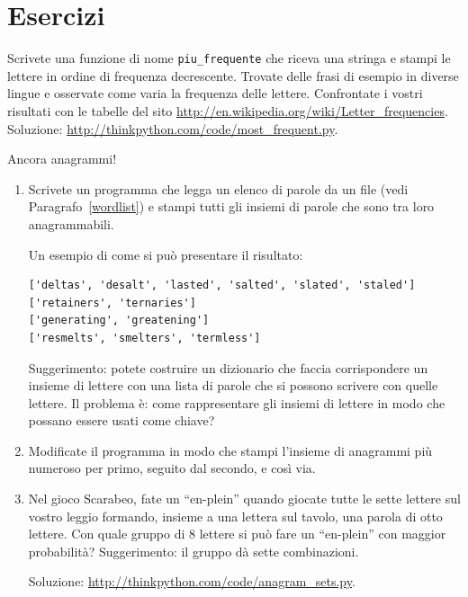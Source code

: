 \documentclass[10pt]{book}
\begin{document}
\section{Esercizi}

\begin{exercise}

Scrivete una funzione di nome \verb"piu_frequente" che riceva una stringa e stampi le lettere in ordine di frequenza decrescente. Trovate delle frasi di esempio in diverse lingue e osservate come varia la frequenza delle lettere. Confrontate i vostri risultati con le tabelle del sito
\url{http://en.wikipedia.org/wiki/Letter_frequencies}.  Soluzione:
\url{http://thinkpython.com/code/most_frequent.py}.  

\end{exercise}


\begin{exercise}
\label{anagrams}

Ancora anagrammi!

\begin{enumerate}

\item Scrivete un programma che legga un elenco di parole da un file (vedi Paragrafo~\ref{wordlist}) e stampi tutti gli insiemi di parole che sono tra loro anagrammabili.

Un esempio di come si può presentare il risultato:

\begin{verbatim}
['deltas', 'desalt', 'lasted', 'salted', 'slated', 'staled']
['retainers', 'ternaries']
['generating', 'greatening']
['resmelts', 'smelters', 'termless']
\end{verbatim}
%
Suggerimento: potete costruire un dizionario che faccia corrispondere un insieme di lettere con una lista di parole che si possono scrivere con quelle lettere. Il problema è: come rappresentare gli insiemi di lettere in modo che possano essere usati come chiave?

\item Modificate il programma in modo che stampi l'insieme di anagrammi più numeroso per primo, seguito dal secondo, e così via.

\item Nel gioco Scarabeo, fate un ``en-plein'' quando giocate tutte le sette lettere sul vostro leggio formando, insieme a una lettera sul tavolo, una parola di otto lettere. Con quale gruppo di 8 lettere si può fare un ``en-plein'' con maggior probabilità?
Suggerimento: il gruppo dà sette combinazioni.


Soluzione: \url{http://thinkpython.com/code/anagram_sets.py}.

\end{enumerate}
\end{exercise}
\end{document}
